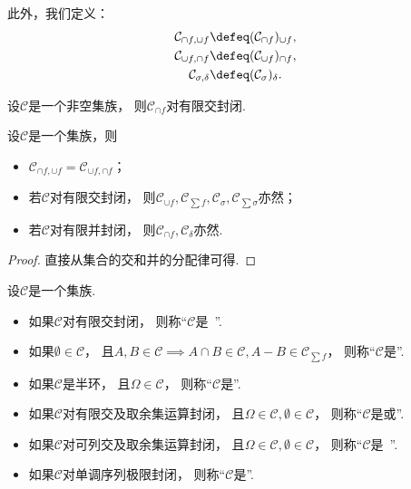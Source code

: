 此外，我们定义：\begin{gather*}
	\mathcal{C}_{\cap f,\cup f}
	\defeq
	(\mathcal{C}_{\cap f})_{\cup f}, \\
	\mathcal{C}_{\cup f,\cap f}
	\defeq
	(\mathcal{C}_{\cup f})_{\cap f}, \\
	\mathcal{C}_{\sigma,\delta}
	\defeq
	(\mathcal{C}_\sigma)_\delta.
\end{gather*}

\begin{proposition}
设\(\mathcal{C}\)是一个非空集族，
则\(\mathcal{C}_{\cap f}\)对有限交封闭.
\end{proposition}

\begin{proposition}
设\(\mathcal{C}\)是一个集族，则\begin{itemize}
	\item \(\mathcal{C}_{\cap f,\cup f} = \mathcal{C}_{\cup f,\cap f}\)；
	\item 若\(\mathcal{C}\)对有限交封闭，
	则\(\mathcal{C}_{\cup f},
	\mathcal{C}_{\sum f},
	\mathcal{C}_\sigma,
	\mathcal{C}_{\sum \sigma}\)亦然；
	\item 若\(\mathcal{C}\)对有限并封闭，
	则\(\mathcal{C}_{\cap f},
	\mathcal{C}_\delta\)亦然.
\end{itemize}
\begin{proof}
直接从集合的交和并的分配律可得.
\end{proof}
\end{proposition}

\begin{definition}
设\(\mathcal{C}\)是一个集族.
\begin{itemize}
	\item 如果\(\mathcal{C}\)对有限交封闭，
	则称“\(\mathcal{C}\)是~”.
	\item 如果\(\emptyset\in\mathcal{C}\)，
	且\(A,B\in\mathcal{C} \implies A \cap B \in \mathcal{C}, A-B \in \mathcal{C}_{\sum f}\)，
	则称“\(\mathcal{C}\)是”.
	\item 如果\(\mathcal{C}\)是半环，
	且\(\Omega\in\mathcal{C}\)，
	则称“\(\mathcal{C}\)是”.
	\item 如果\(\mathcal{C}\)对有限交及取余集运算封闭，
	且\(\Omega\in\mathcal{C},
	\emptyset\in\mathcal{C}\)，
	则称“\(\mathcal{C}\)是或”.
	\item 如果\(\mathcal{C}\)对可列交及取余集运算封闭，
	且\(\Omega\in\mathcal{C},
	\emptyset\in\mathcal{C}\)，
	则称“\(\mathcal{C}\)是~”.
	\item 如果\(\mathcal{C}\)对单调序列极限封闭，
	则称“\(\mathcal{C}\)是”.
\end{itemize}
\end{definition}
